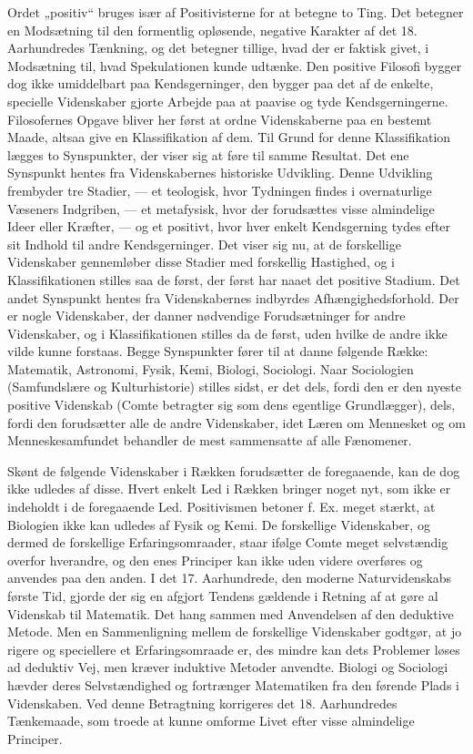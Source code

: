 \documentclass[12pt,a4paper,openany]{book}
\newcommand{\opage}[1]{\marginnote{\footnotesize\textit{[#1]}}}
\begin{document}
Ordet „positiv“ bruges især af Positivisterne for at betegne to Ting.
Det betegner en Modsætning til den formentlig opløsende, negative
Karakter af det 18. Aarhundredes Tænkning, og det betegner tillige,
hvad der er faktisk givet, i Modsætning til, hvad Spekulationen
kunde udtænke. Den positive Filosofi bygger dog ikke umiddelbart
paa Kendsgerninger, den bygger paa det af de enkelte, specielle Videnskaber
gjorte Arbejde paa at paavise og tyde Kendsgerningerne.
Filosofernes Opgave bliver her først at ordne Videnskaberne paa
en bestemt Maade, altsaa give en Klassifikation af dem. Til Grund
for denne Klassifikation lægges to Synspunkter, der viser sig at føre
til samme Resultat. Det ene Synspunkt hentes fra Videnskabernes
historiske Udvikling. Denne Udvikling frembyder tre Stadier, --- et
teologisk, hvor Tydningen findes i overnaturlige Væseners Indgriben,
--- et metafysisk, hvor der forudsættes visse almindelige Ideer eller
Kræfter, --- og et positivt, hvor hver enkelt Kendsgerning tydes efter
sit Indhold til andre Kendsgerninger. Det viser sig nu, at de forskellige
Videnskaber gennemløber disse Stadier med forskellig Hastighed,
og i Klassifikationen stilles saa de først, der først har naaet det
positive Stadium. Det andet Synspunkt hentes fra Videnskabernes
indbyrdes Afhængighedsforhold. Der er nogle Videnskaber, der danner
nødvendige Forudsætninger for andre Videnskaber, og i Klassifikationen
stilles da de først, uden hvilke de andre ikke vilde kunne
forstaas. Begge Synspunkter fører til at danne følgende Række: Matematik,
Astronomi, Fysik, Kemi, Biologi, Sociologi. Naar Sociologien
(Samfundslære og Kulturhistorie) stilles sidst, er det dels, fordi den
\opage{17}er den nyeste positive Videnskab (Comte betragter sig som dens
egentlige Grundlægger), dels, fordi den forudsætter alle de andre
Videnskaber, idet Læren om Mennesket og om Menneskesamfundet
behandler de mest sammensatte af alle Fænomener.

Skønt de følgende Videnskaber i Rækken forudsætter de foregaaende,
kan de dog ikke udledes af disse. Hvert enkelt Led i Rækken
bringer noget nyt, som ikke er indeholdt i de foregaaende Led. Positivismen
betoner f. Ex. meget stærkt, at Biologien ikke kan udledes
af Fysik og Kemi. De forskellige Videnskaber, og dermed de forskellige
Erfaringsomraader, staar ifølge Comte meget selvstændig
overfor hverandre, og den enes Principer kan ikke uden videre overføres
og anvendes paa den anden. I det 17. Aarhundrede, den moderne
Naturvidenskabs første Tid, gjorde der sig en afgjort Tendens
gældende i Retning af at gøre al Videnskab til Matematik. Det hang
sammen med Anvendelsen af den deduktive Metode. Men en Sammenligning
mellem de forskellige Videnskaber godtgør, at jo rigere
og speciellere et Erfaringsomraade er, des mindre kan dets Problemer
løses ad deduktiv Vej, men kræver induktive Metoder anvendte.
Biologi og Sociologi hævder deres Selvstændighed og fortrænger Matematiken
fra den førende Plads i Videnskaben. Ved denne Betragtning
korrigeres det 18. Aarhundredes Tænkemaade, som troede at
kunne omforme Livet efter visse almindelige Principer.
\end{document}
